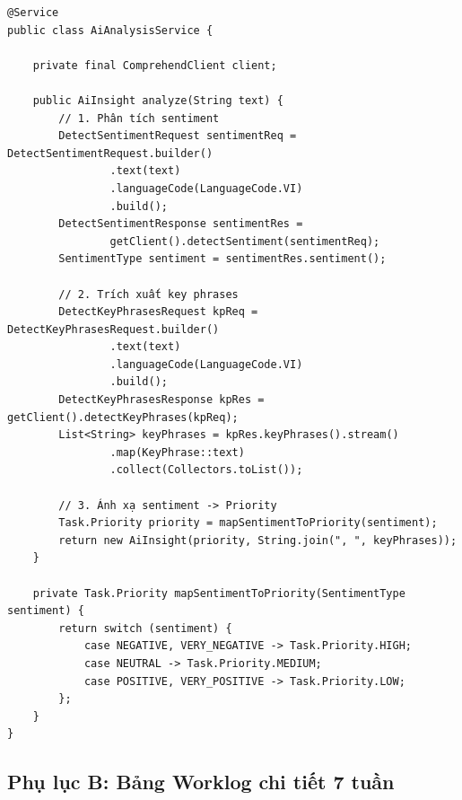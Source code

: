 \documentclass[13pt]{extarticle}
\begin{document}
\begin{lstlisting}[style=javastyle, caption={AiAnalysisService -- Gọi Comprehend và gợi ý Priority}, label={lst:ai-service}]
@Service
public class AiAnalysisService {

    private final ComprehendClient client;

    public AiInsight analyze(String text) {
        // 1. Phân tích sentiment
        DetectSentimentRequest sentimentReq = DetectSentimentRequest.builder()
                .text(text)
                .languageCode(LanguageCode.VI)
                .build();
        DetectSentimentResponse sentimentRes =
                getClient().detectSentiment(sentimentReq);
        SentimentType sentiment = sentimentRes.sentiment();

        // 2. Trích xuất key phrases
        DetectKeyPhrasesRequest kpReq = DetectKeyPhrasesRequest.builder()
                .text(text)
                .languageCode(LanguageCode.VI)
                .build();
        DetectKeyPhrasesResponse kpRes = getClient().detectKeyPhrases(kpReq);
        List<String> keyPhrases = kpRes.keyPhrases().stream()
                .map(KeyPhrase::text)
                .collect(Collectors.toList());

        // 3. Ánh xạ sentiment -> Priority
        Task.Priority priority = mapSentimentToPriority(sentiment);
        return new AiInsight(priority, String.join(", ", keyPhrases));
    }

    private Task.Priority mapSentimentToPriority(SentimentType sentiment) {
        return switch (sentiment) {
            case NEGATIVE, VERY_NEGATIVE -> Task.Priority.HIGH;
            case NEUTRAL -> Task.Priority.MEDIUM;
            case POSITIVE, VERY_POSITIVE -> Task.Priority.LOW;
        };
    }
}
\end{lstlisting}

\subsection*{Phụ lục B: Bảng Worklog chi tiết 7 tuần}
\end{document}

